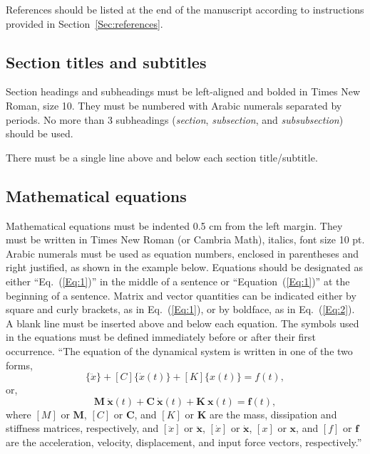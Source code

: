 \documentclass[10pt,fleqn,a4paper,twoside]{article}
\begin{document}
References should be listed at the end of the manuscript according to instructions provided in Section~\ref{Sec:references}.

\subsection{Section titles and subtitles}

Section headings and subheadings must be left-aligned and bolded in Times New Roman, size 10. They must be numbered with Arabic numerals separated by periods. No more than 3 subheadings (\emph{section}, \emph{subsection}, and \emph{subsubsection}) should be used. 

There must be a single line above and below each section title/subtitle.

\subsection{Mathematical equations}

Mathematical equations must be indented 0.5 cm from the left margin. They must be written in Times New Roman (or Cambria Math), italics, font size 10 pt. Arabic numerals must be used as equation numbers, enclosed in parentheses and right justified, as shown in the example below. Equations should be designated as either ``Eq.~(\ref{Eq:1})'' in the middle of a sentence or ``Equation~(\ref{Eq:1})'' at the beginning of a sentence. Matrix and vector quantities can be indicated either by square and curly brackets, as in Eq.~(\ref{Eq:1}), or by boldface, as in Eq.~(\ref{Eq:2}). A blank line must be inserted above and below each equation. The symbols used in the equations must be defined immediately before or after their first occurrence.
“The equation of the dynamical system is written in one of the two forms,
\begin{equation}
[M]\{\ddot{x}\}+[C]\{\dot{x}(t)\}+[K]\{x(t)\}={f(t)},
\label{Eq:1}
\end{equation}
or,
\begin{equation}
\mathbf{M}\ \ddot{\mathbf{x}}(t)+\mathbf{C}\ \dot{\mathbf{x}}(t)+\mathbf{K}\ \mathbf{x}(t)=\mathbf{f}(t), 
\label{Eq:2}
\end{equation}
where $[M]$ or $\mathbf{M}$, $[C]$ or $\mathbf{C}$, and $[K]$ or $\mathbf{K}$ are the mass, dissipation and stiffness matrices, respectively, and $[\ddot{x}]$ or $\ddot{\mathbf{x}}$, $[\dot{x}]$ or $\dot{\mathbf{x}}$, $[x]$ or $\mathbf{x}$, and $[f]$ or $\mathbf{f}$ are the acceleration, velocity, displacement, and input force vectors, respectively.''
\end{document}
